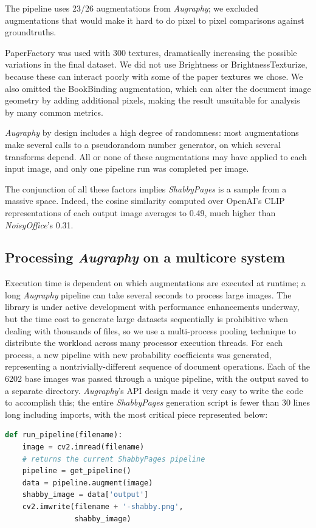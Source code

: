 \documentclass[runningheads]{llncs}
\begin{document}
The pipeline uses 23/26 augmentations from \emph{Augraphy}; we excluded augmentations that would make it hard to do pixel to pixel comparisons against groundtruths.

PaperFactory was used with 300 textures, dramatically increasing the possible variations in the final dataset. We did not use Brightness or BrightnessTexturize, because these can interact poorly with some of the paper textures we chose. We also omitted the BookBinding augmentation, which can alter the document image geometry by adding additional pixels, making the result unsuitable for analysis by many common metrics.

\emph{Augraphy} by design includes a high degree of randomness: most augmentations make several calls to a pseudorandom number generator, on which several transforms depend.
All or none of these augmentations may have applied to each input image, and only one pipeline run was completed per image.

The conjunction of all these factors implies \emph{ShabbyPages} is a sample from a massive space.
Indeed, the cosine similarity computed over OpenAI's CLIP representations of each output image averages to 0.49, much higher than \emph{NoisyOffice}'s 0.31.

\subsection{Processing \emph{Augraphy} on a multicore system}
Execution time is dependent on which augmentations are executed at runtime; a long \emph{Augraphy} pipeline can take several seconds to process large images.
The library is under active development with performance enhancements underway, but the time cost to generate large datasets sequentially is prohibitive when dealing with thousands of files, so we use a multi-process pooling technique to distribute the workload across many processor execution threads.
For each process, a new pipeline with new probability coefficients was generated, representing a nontrivially-different sequence of document operations.
Each of the 6202 base images was passed through a unique pipeline, with the output saved to a separate directory.
\emph{Augraphy}'s API design made it very easy to write the code to accomplish this; the entire \emph{ShabbyPages} generation script is fewer than 30 lines long including imports, with the most critical piece represented below:

\begin{lstlisting}[language=Python]
  def run_pipeline(filename):
    image = cv2.imread(filename)
    # returns the current ShabbyPages pipeline
    pipeline = get_pipeline()
    data = pipeline.augment(image)
    shabby_image = data['output']
    cv2.imwrite(filename + '-shabby.png',
                shabby_image)
\end{lstlisting}
\end{document}
